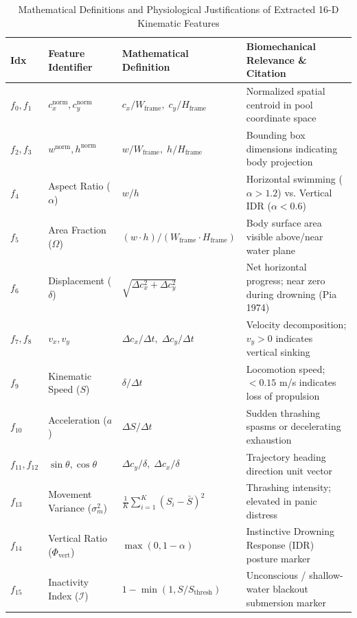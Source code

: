 \begin{table}[t]
\centering
\caption{Mathematical Definitions and Physiological Justifications of Extracted 16-D Kinematic Features}
\label{tab:biomechanical_features}
\begin{tabular}{llll}
\toprule
\textbf{Idx} & \textbf{Feature Identifier} & \textbf{Mathematical Definition} & \textbf{Biomechanical Relevance \& Citation} \\
\midrule
$f_0, f_1$   & $c_{x}^{\text{norm}}, c_{y}^{\text{norm}}$ & $c_x / W_{\text{frame}}, \; c_y / H_{\text{frame}}$ & Normalized spatial centroid in pool coordinate space \\
$f_2, f_3$   & $w^{\text{norm}}, h^{\text{norm}}$         & $w / W_{\text{frame}}, \; h / H_{\text{frame}}$     & Bounding box dimensions indicating body projection \\
$f_4$        & Aspect Ratio ($\alpha$)                    & $w / h$                                            & Horizontal swimming ($\alpha > 1.2$) vs. Vertical IDR ($\alpha < 0.6$) \\
$f_5$        & Area Fraction ($\Omega$)                   & $(w \cdot h) / (W_{\text{frame}} \cdot H_{\text{frame}})$ & Body surface area visible above/near water plane \\
$f_6$        & Displacement ($\delta$)                    & $\sqrt{\Delta c_x^2 + \Delta c_y^2}$               & Net horizontal progress; near zero during drowning (Pia 1974) \\
$f_7, f_8$   & $v_x, v_y$                                 & $\Delta c_x / \Delta t, \; \Delta c_y / \Delta t$  & Velocity decomposition; $v_y > 0$ indicates vertical sinking \\
$f_9$        & Kinematic Speed ($S$)                      & $\delta / \Delta t$                                & Locomotion speed; $< 0.15$ m/s indicates loss of propulsion \\
$f_{10}$     & Acceleration ($a$)                         & $\Delta S / \Delta t$                              & Sudden thrashing spasms or decelerating exhaustion \\
$f_{11}, f_{12}$ & $\sin \theta, \cos \theta$             & $\Delta c_y / \delta, \; \Delta c_x / \delta$      & Trajectory heading direction unit vector \\
$f_{13}$     & Movement Variance ($\sigma_m^2$)           & $\frac{1}{K}\sum_{i=1}^{K} (S_i - \bar{S})^2$       & Thrashing intensity; elevated in panic distress \\
$f_{14}$     & Vertical Ratio ($\Phi_{\text{vert}}$)      & $\max(0, 1 - \alpha)$                              & Instinctive Drowning Response (IDR) posture marker \\
$f_{15}$     & Inactivity Index ($\mathcal{I}$)           & $1 - \min(1, S / S_{\text{thresh}})$               & Unconscious / shallow-water blackout submersion marker \\
\bottomrule
\end{tabular}
\end{table}

